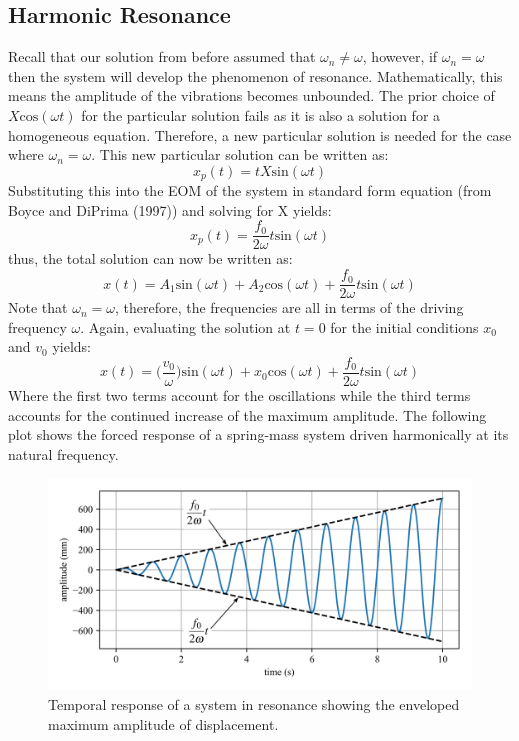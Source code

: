 \documentclass[12pt,letter]{article}
\numberwithin{ex}{section} %
\numberwithin{re}{section} %
\numberwithin{vcs}{section} %
\begin{document}
			
		\subsection{Harmonic Resonance}			
			
			Recall that our solution from before assumed that $\omega_n \neq \omega$, however, if $\omega_n = \omega$ then the system will develop the phenomenon of resonance. Mathematically, this means the amplitude of the vibrations becomes unbounded. The prior choice of $X\text{cos}(\omega t)$ for the particular solution fails as it is also a solution for a homogeneous equation. Therefore, a new particular solution is needed for the case where $\omega_n = \omega$. This new particular solution can be written as:
			\begin{equation}
				x_p(t) = t X\text{sin}(\omega t)
			\end{equation}				
			Substituting this into the EOM of the system in standard form equation (from Boyce and DiPrima (1997)) and solving for X yields:
			\begin{equation}
				x_p(t) = \frac{f_0}{2 \omega} t \text{sin}(\omega t)
			\end{equation}	
			thus, the total solution can now be written as:
			\begin{equation}
				x(t) = A_1\text{sin}(\omega t) + A_2\text{cos}(\omega t) + \frac{f_0}{2 \omega} t \text{sin}(\omega t)
			\end{equation}			
			Note that $\omega_n=\omega$, therefore, the frequencies are all in terms of the driving frequency $\omega$. Again, evaluating the solution at $t=0$ for the initial conditions $x_0$ and $v_0$ yields:
			\begin{equation}
				x(t) = \Big(\frac{v_0}{\omega}\Big)\text{sin}(\omega t) + x_0\text{cos}(\omega t) + \frac{f_0}{2 \omega} t \text{sin}(\omega t)
			\end{equation}			
			Where the first two terms account for the oscillations while the third terms accounts for the continued increase of the maximum amplitude. The following plot shows the forced response of a spring-mass system driven harmonically at its natural frequency.
			\begin{figure}[H]
				\centering
				\includegraphics[]{../figures/resonance.png}
				\caption{Temporal response of a system in resonance showing the enveloped maximum amplitude of displacement.}
			\end{figure}				
\end{document}
